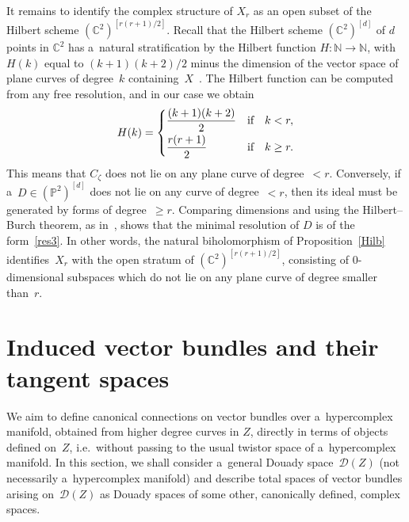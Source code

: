 \documentclass[pdftex]{sigma}
\numberwithin{equation}{section}
\begin{document}
It remains to identify the complex structure of $X_r$ as an open subset of the Hilbert scheme $({\mathbb
C}^2)^{[r(r+1)/2]}$.
Recall that the Hilbert scheme $({\mathbb C}^2)^{[d]}$ of $d$ points in ${\mathbb C}^2$ has a~natural stratif\/ication by
the Hilbert function $H:{\mathbb{N}}\to {\mathbb{N}}$, with~$H(k)$ equal to $(k+1)(k+2)/2$ minus the dimension of the
vector space of plane curves of degree~$k$ containing~$X$~\cite{Eis1}.
The Hilbert function can be computed from any free resolution, and in our case we obtain
\begin{gather*}
H(k)=
\begin{cases}
\dfrac{(k+1)(k+2)}{2} &\text{if}\quad k<r,
\vspace{1mm}\\
\dfrac{r(r+1)}{2} & \text{if}\quad k\geq r.
\end{cases}
\end{gather*}
This means that $C_\zeta$ does not lie on any plane curve of degree~${<}r$.
Conversely, if a~$D\in ({\mathbb{P}}^2)^{[d]}$ does not lie on any curve of degree~${<}r$, then its ideal must be
generated by forms of degree~${\geq}r$.
Comparing dimensions and using the Hilbert--Burch theorem, as in~\cite[\S~20.4.1]{Eis1}, shows that the minimal
resolution of $D$ is of the form~\eqref{res3}.
In other words, the natural biholomorphism of Proposition~\ref{Hilb} identif\/ies~$X_r$ with the open stratum of
$({\mathbb C}^2)^{[r(r+1)/2]}$, consisting of $0$-dimensional subspaces which do not lie on any plane curve of degree
smaller than~$r$.

\section{Induced vector bundles and their tangent spaces}%

We aim to def\/ine canonical connections on vector bundles over a~hypercomplex manifold, obtained from higher degree
curves in $Z$, directly in terms of objects def\/ined on~$Z$, i.e.\
without passing to the usual twistor space of a~hypercomplex manifold.
In this section, we shall consider a~general Douady space~${\mathcal{D}}(Z)$ (not necessarily a~hypercomplex manifold)
and describe total spaces of vector bundles arising on~${\mathcal{D}}(Z)$ as Douady spaces of some other, canonically
def\/ined, complex spaces.
\end{document}
